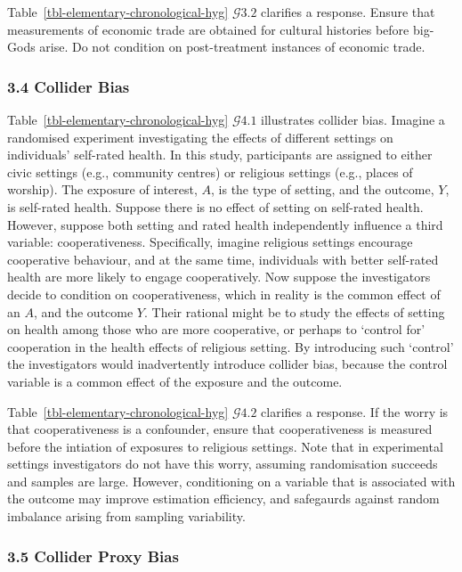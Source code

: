 \documentclass[
  single column]{article}
\begin{document}
Table~\ref{tbl-elementary-chronological-hyg} \(\mathcal{G} 3.2\)
clarifies a response. Ensure that measurements of economic trade are
obtained for cultural histories before big-Gods arise. Do not condition
on post-treatment instances of economic trade.

\subsubsection{3.4 Collider Bias}\label{collider-bias}

Table~\ref{tbl-elementary-chronological-hyg} \(\mathcal{G} 4.1\)
illustrates collider bias. Imagine a randomised experiment investigating
the effects of different settings on individuals' self-rated health. In
this study, participants are assigned to either civic settings (e.g.,
community centres) or religious settings (e.g., places of worship). The
exposure of interest, \(A\), is the type of setting, and the outcome,
\(Y\), is self-rated health. Suppose there is no effect of setting on
self-rated health. However, suppose both setting and rated health
independently influence a third variable: cooperativeness. Specifically,
imagine religious settings encourage cooperative behaviour, and at the
same time, individuals with better self-rated health are more likely to
engage cooperatively. Now suppose the investigators decide to condition
on cooperativeness, which in reality is the common effect of an \(A\),
and the outcome \(Y\). Their rational might be to study the effects of
setting on health among those who are more cooperative, or perhaps to
`control for' cooperation in the health effects of religious setting. By
introducing such `control' the investigators would inadvertently
introduce collider bias, because the control variable is a common effect
of the exposure and the outcome.

Table~\ref{tbl-elementary-chronological-hyg} \(\mathcal{G} 4.2\)
clarifies a response. If the worry is that cooperativeness is a
confounder, ensure that cooperativeness is measured before the intiation
of exposures to religious settings. Note that in experimental settings
investigators do not have this worry, assuming randomisation succeeds
and samples are large. However, conditioning on a variable that is
associated with the outcome may improve estimation efficiency, and
safegaurds against random imbalance arising from sampling variability.

\subsubsection{3.5 Collider Proxy Bias}\label{collider-proxy-bias}
\end{document}
